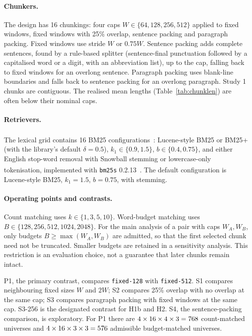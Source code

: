 \documentclass[11pt]{article}
\newcommand{\chunk}[1]{\texttt{#1}}
\newcommand{\citeL}[1]{\cite{#1}\textsuperscript{\textcolor{red}{\dag}}}
\begin{document}


\paragraph{Chunkers.}
The design has 16 chunkings: four caps $W\in\{64,128,256,512\}$ applied to fixed windows, fixed windows with 25\%
overlap, sentence packing and paragraph packing. Fixed windows use stride $W$ or $0.75W$. Sentence packing adds
complete sentences, found by a rule-based splitter (sentence-final punctuation followed by a capitalised word or a
digit, with an abbreviation list), up to the cap, falling back to fixed windows for an overlong sentence. Paragraph
packing uses blank-line boundaries and falls back to sentence packing for an overlong paragraph. Study 1 chunks are
contiguous. The realised mean lengths (Table~\ref{tab:chunklen}) are often below their nominal caps.

\paragraph{Retrievers.}
The lexical grid contains 16 BM25 configurations~\citeL{robertson2009bm25}: Lucene-style BM25 or BM25+ (with the
library's default $\delta = 0.5$), $k_1\in\{0.9,1.5\}$, $b\in\{0.4,0.75\}$, and either English stop-word removal
with Snowball stemming or lowercase-only tokenisation, implemented with \texttt{bm25s}
0.2.13~\citeL{lu2024bm25s}. The default configuration is Lucene-style BM25, $k_1=1.5$, $b=0.75$, with stemming.

\paragraph{Operating points and contrasts.}
Count matching uses $k\in\{1,3,5,10\}$. Word-budget matching uses $B\in\{128,256,512,1024,2048\}$. For the main
analysis of a pair with caps $W_A,W_B$, only budgets $B\geq\max(W_A,W_B)$ are admitted, so that the first selected
chunk need not be truncated. Smaller budgets are retained in a sensitivity analysis. This restriction is an
evaluation choice, not a guarantee that later chunks remain intact.

P1, the primary contrast, compares \chunk{fixed-128} with \chunk{fixed-512}. S1 compares neighbouring fixed sizes $W$
and $2W$; S2 compares 25\% overlap with no overlap at the same cap; S3 compares paragraph packing with fixed windows at
the same cap. S3-256 is the designated contrast for H1b and H2. S4, the sentence-packing comparison, is exploratory.
For P1 there are $4\times16\times4\times3=768$ count-matched universes and
$4\times16\times3\times3=576$ admissible budget-matched universes.
\end{document}
